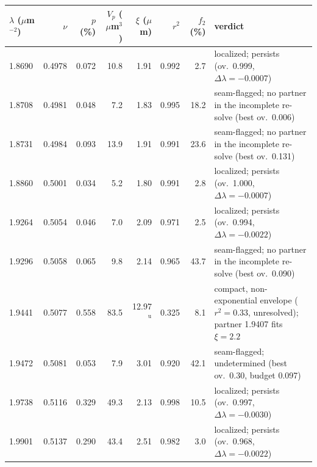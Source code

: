 \begin{tabular}{@{}lrrrrrrl@{}}
\hline\hline
 $\lambda$ ($\mu$m$^{-2}$) & $\nu$ & $p$ (\%) & $V_p$ ($\mu$m$^3$) & $\xi$ ($\mu$m) & $r^2$ & $f_2$ (\%) & verdict \\
\hline
 1.8690 & 0.4978 & 0.072 & 10.8 & 1.91 & 0.992 & 2.7 & localized; persists (ov.\ 0.999, $\Delta\lambda=-0.0007$) \\
 1.8708 & 0.4981 & 0.048 & 7.2 & 1.83 & 0.995 & 18.2 & seam-flagged; no partner in the incomplete re-solve (best ov.\ 0.006) \\
 1.8731 & 0.4984 & 0.093 & 13.9 & 1.91 & 0.991 & 23.6 & seam-flagged; no partner in the incomplete re-solve (best ov.\ 0.131) \\
 1.8860 & 0.5001 & 0.034 & 5.2 & 1.80 & 0.991 & 2.8 & localized; persists (ov.\ 1.000, $\Delta\lambda=-0.0007$) \\
 1.9264 & 0.5054 & 0.046 & 7.0 & 2.09 & 0.971 & 2.5 & localized; persists (ov.\ 0.994, $\Delta\lambda=-0.0022$) \\
 1.9296 & 0.5058 & 0.065 & 9.8 & 2.14 & 0.965 & 43.7 & seam-flagged; no partner in the incomplete re-solve (best ov.\ 0.090) \\
 1.9441 & 0.5077 & 0.558 & 83.5 & 12.97$^\mathrm{u}$ & 0.325 & 8.1 & compact, non-exponential envelope ($r^2=0.33$, unresolved); partner 1.9407 fits $\xi=2.2$ \\
 1.9472 & 0.5081 & 0.053 & 7.9 & 3.01 & 0.920 & 42.1 & seam-flagged; undetermined (best ov.\ 0.30, budget 0.097) \\
 1.9738 & 0.5116 & 0.329 & 49.3 & 2.13 & 0.998 & 10.5 & localized; persists (ov.\ 0.997, $\Delta\lambda=-0.0030$) \\
 1.9901 & 0.5137 & 0.290 & 43.4 & 2.51 & 0.982 & 3.0 & localized; persists (ov.\ 0.968, $\Delta\lambda=-0.0022$) \\
\hline\hline
\end{tabular}
